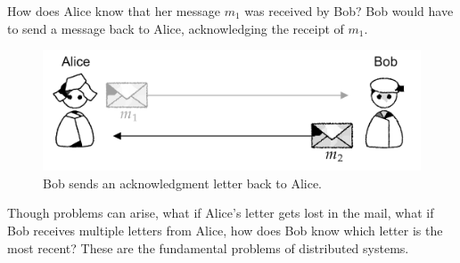 \noindent
How does Alice know that her message $m_1$ was received by Bob? Bob 
would have to send a message back to Alice, acknowledging the receipt of $m_1$.

\begin{figure}[h]
    \centering
    \includegraphics[width=.8\textwidth]{./Sections/high/com_2.png}
    \caption{Bob sends an acknowledgment letter back to Alice.}
\end{figure}
    
\noindent
Though problems can arise, what if Alice's letter gets lost in the mail, what if Bob receives multiple 
letters from Alice, how does Bob know which letter is the most recent? These are the fundamental problems 
of distributed systems.
